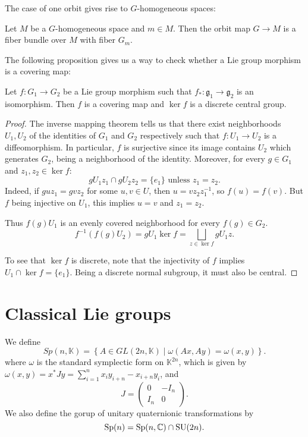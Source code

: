 \documentclass{report}
\begin{document}
The case of one orbit gives rise to $G$-homogeneous spaces:
\begin{theorem}
    Let $M$ be a $G$-homogeneous space and $m \in M$.
    Then the orbit map $G \to M$ is a fiber bundle over $M$ with fiber $G_m$.
\end{theorem}

The following proposition gives us a way to check whether a Lie group morphism is a covering map:
\begin{proposition}
    Let $f:G_1 \to G_2$ be a Lie group morphism such that $f_*: \mathfrak g_1 \to \mathfrak g_2$ is an isomorphism.
    Then $f$ is a covering map and $\ker f$ is a discrete central group.
\end{proposition}
\begin{proof}
    The inverse mapping theorem tells us that there exist neighborhoods $U_1, U_2$ of the identities of $G_1$ and $G_2$ respectively such that $f:U_1 \to U_2$ is a diffeomorphism.
    In particular, $f$ is surjective since its image contains $U_2$ which generates $G_2$, being a neighborhood of the identity.
    Moreover, for every $g \in G_1$ and $z_1, z_2 \in \ker f$:
    \[
        gU_1 z_1 \cap gU_2 z_2 = \{e_1\} \text{ unless } z_1 = z_2.
    \]
    Indeed, if $g u z_1 = g v z_2$ for some $u, v \in U$, then $u = v z_2 z_1^{-1}$, so $f(u) = f(v)$.
    But $f$ being injective on $U_1$, this implies $u = v$ and $z_1 = z_2$.

    Thus $f(g)U_1$ is an evenly covered neighborhood for every $f(g) \in G_2$.
    \[
    f^{-1}(f(g)U_2) = g U_1 \ker f = \bigsqcup_{z \in \ker f} g U_1 z.
    \]

    To see that $\ker f$ is discrete, note that the injectivity of $f$ implies $U_1 \cap \ker f = \{ e_1 \}$.
    Being a discrete normal subgroup, it must also be central.
\end{proof}

\section{Classical Lie groups}

\begin{definition}
    We define
    \[
    Sp(n, \mathbb K) = 
    \left\{
        A \in GL(2n, \mathbb K) \mid \omega(Ax, Ay) = \omega(x, y)
    \right\}.
    \]
    where $\omega$ is the standard symplectic form on $\mathbb K^{2n}$, which is given by
    $\omega(x, y) = x^* J y = \sum_{i=1}^n x_i y_{i+n} - x_{i+n}y_i$, 
    and 
    \[
    J = 
    \begin{pmatrix}
    0 & -I_n \\
    I_n & 0
    \end{pmatrix}.
    \]
    We also define the gorup of unitary quaternionic transformations by
    \[
    \operatorname{{\mathrm{Sp}}}(n) = \operatorname{{\mathrm{Sp}}}(n, \mathbb C) \cap \operatorname{{\mathrm{SU}}}(2n).
    \]
\end{definition}
\end{document}
